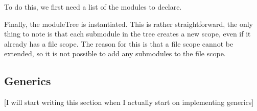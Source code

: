 To do this, we first need a list of the modules to declare.



Finally, the moduleTree is instantiated.
This is rather straightforward, the only thing to note is that each submodule in the tree creates a new scope, even if it already has a file scope.
The reason for this is that a file scope cannot be extended, so it is not possible to add any submodules to the file scope.




\subsection{\label{subsec:solution__statix__generics}Generics}
[I will start writing this section when I actually start on implementing generics]
